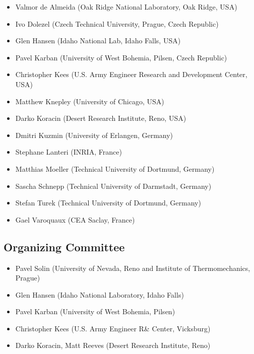 \documentclass[article,A4,11pt]{llncs}
\begin{document}
\begin{itemize}
\item Valmor de Almeida (Oak Ridge National Laboratory, Oak Ridge, USA)
\item Ivo Dolezel (Czech Technical University, Prague, Czech Republic)
\item Glen Hansen (Idaho National Lab, Idaho Falls, USA)
\item Pavel Karban (University of West Bohemia, Pilsen, Czech Republic)
\item Christopher Kees (U.S. Army Engineer Research and Development Center, USA)
\item Matthew Knepley (University of Chicago, USA)
\item Darko Koracin (Desert Research Institute, Reno, USA)
\item Dmitri Kuzmin (University of Erlangen, Germany)
\item Stephane Lanteri (INRIA, France)
\item Matthias Moeller (Technical University of Dortmund, Germany)
\item Sascha Schnepp (Technical University of Darmstadt, Germany)
\item Stefan Turek (Technical University of Dortmund, Germany)
\item Gael Varoquaux (CEA Saclay, France)
\end{itemize}

\subsection*{Organizing Committee}

\begin{itemize}
\item Pavel Solin (University of Nevada, Reno and Institute of Thermomechanics, Prague)
\item Glen Hansen (Idaho National Laboratory, Idaho Falls)
\item Pavel Karban  (University of West Bohemia, Pilsen)
\item Christopher Kees (U.S. Army Engineer R\& Center, Vicksburg)
\item Darko Koracin, Matt Reeves (Desert Research Institute, Reno)
\end{itemize}

\newpage
{\ }
\tableofcontents
\pagestyle{plain}

\end{document}
